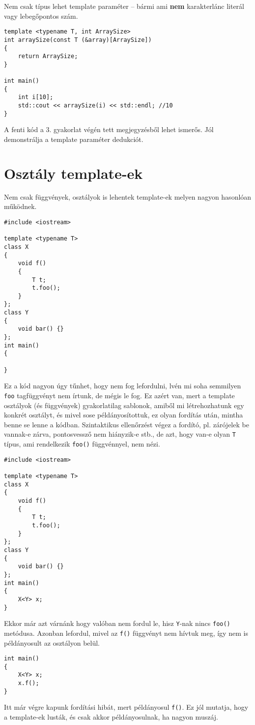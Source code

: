 \documentclass[a4paper,11.5pt]{article}
\begin{document}
	\medskip
	Nem csak típus lehet template paraméter -- bármi ami \textbf{nem} karakterlánc literál vagy lebegőpontos szám.
	\begin{lstlisting}
template <typename T, int ArraySize>
int arraySize(const T (&array)[ArraySize])
{
	return ArraySize;
}

int main()
{
	int i[10];
	std::cout << arraySize(i) << std::endl; //10
}
	\end{lstlisting}
	A fenti kód a 3. gyakorlat végén tett megjegyzésből lehet ismerős. Jól demonstrálja a template paraméter dedukciót.
	\section{Osztály template-ek}
	Nem csak függvények, osztályok is lehentek template-ek melyen nagyon hasonlóan működnek.
	\begin{lstlisting}
#include <iostream>

template <typename T>
class X
{
	void f()
	{
		T t;
		t.foo();
	}
};
class Y
{
	void bar() {}
};
int main()
{
	
}
	\end{lstlisting}
	Ez a kód nagyon úgy tűnhet, hogy nem fog lefordulni, lvén mi soha semmilyen \texttt{foo} tagfüggvényt nem írtunk, de mégis le fog. Ez azért van, mert a template osztályok (és függvények) gyakorlatilag sablonok, amiből mi létrehozhatunk egy konkrét osztályt, és mivel sose példányosítottuk, ez olyan fordítás után, mintha benne se lenne a kódban. Szintaktikus ellenőrzést végez a fordító, pl. zárójelek be vannak-e zárva, pontosvessző nem hiányzik-e stb., de azt, hogy van-e olyan \texttt{T} típus, ami rendelkezik \texttt{foo()} függvénnyel, nem nézi.
\begin{lstlisting}
#include <iostream>

template <typename T>
class X
{
	void f()
	{
		T t;
		t.foo();
	}
};
class Y
{
	void bar() {}
};
int main()
{
	X<Y> x;
}
\end{lstlisting}
	Ekkor már azt várnánk hogy valóban nem fordul le, hisz \texttt{Y}-nak nincs \texttt{foo()} metódusa. Azonban lefordul, mivel az \texttt{f()} függvényt nem hívtuk meg, így nem is példányosult az osztályon belül.
	\begin{lstlisting}
int main()
{
	X<Y> x;
	x.f();
}
	\end{lstlisting}
	Itt már végre kapunk fordítási hibát, mert példányosul \texttt{f()}. Ez jól mutatja, hogy a template-ek lusták, és csak akkor példányosulnak, ha nagyon muszáj.
	\medskip
	
\end{document}
